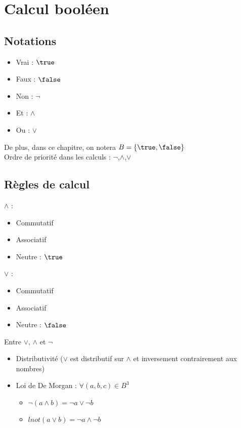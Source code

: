 

\section{Calcul booléen}

\subsection{Notations}

\begin{itemize}
    \item Vrai : $\true$
    \item Faux : $\false$
    \item Non : $\lnot$
    \item Et : $\land$
    \item Ou : $\lor$
\end{itemize}

De plus, dans ce chapitre, on notera $B=\{\true,\false\}$ \\
Ordre de priorité dans les calculs : $\lnot$,$\land$,$\lor$ \\

\subsection{Règles de calcul}

\begin{prop}
    $\land$ :
    \begin{itemize}
        \item Commutatif
        \item Associatif
        \item Neutre : $\true$
    \end{itemize}
\end{prop}

\begin{prop}
    $\lor$ :
    \begin{itemize}
        \item Commutatif
        \item Associatif
        \item Neutre : $\false$
    \end{itemize}
\end{prop}

\begin{prop}
    Entre $\lor$, $\land$ et $\lnot$
    \begin{itemize}
        \item Distributivité ($\lor$ est distributif sur $\land$ et inversement contrairement aux nombres)
        \item Loi de De Morgan : $\forall (a,b,c) \in B^3$
            \begin{itemize}
                \item $\lnot(a\land b)= \lnot a \lor \lnot b$
                \item $lnot(a\lor b)= \lnot a \land \lnot b$
            \end{itemize}
    \end{itemize}
\end{prop}

